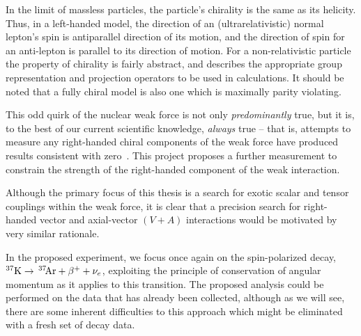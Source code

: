 In the limit of massless particles, the particle's chirality is the same as its helicity. Thus, in a left-handed model, the direction of an (ultrarelativistic) normal lepton's spin is antiparallel direction of its motion, and the direction of spin for an anti-lepton is parallel to its direction of motion.  For a non-relativistic particle the property of chirality is fairly abstract, and describes the appropriate group representation and projection operators to be used in calculations.  It should be noted that a fully chiral model is also one which is maximally parity violating.

This odd quirk of the nuclear weak force is not only \emph{predominantly} true, but it is, to the best of our current scientific knowledge, \emph{always} true -- that is, attempts to measure any right-handed chiral components of the weak force have produced results consistent with zero~\cite{severijns_beck_cuncic_2006}\cite{severijns_cuncic_2011}.  This project proposes a further measurement to constrain the strength of the right-handed component of the weak interaction.  

Although the primary focus of this thesis is a search for exotic scalar and tensor couplings within the weak force, it is clear that a precision search for right-handed vector and axial-vector $(V+A)$ interactions would be motivated by very similar rationale.

In the proposed experiment, we focus once again on the spin-polarized decay, \mbox{$^{37}\textrm{K} \rightarrow \,^{37}\textrm{\!Ar} + \beta^{+} + \nu_e$}, exploiting the principle of conservation of angular momentum as it applies to this transition.  The proposed analysis could be performed on the data that has already been collected, although as we will see, there are some inherent difficulties to this approach which might be eliminated with a fresh set of decay data.




